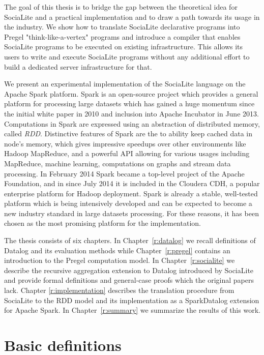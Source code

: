 The goal of this thesis is to bridge the gap between the theoretical idea for SociaLite and a practical implementation and to draw a path towards its usage in the industry. We show how to translate SociaLite declarative programs into Pregel "think-like-a-vertex" programs and introduce a compiler that enables SociaLite programs to be executed on existing infrastructure. This allows its users to write and execute SociaLite programs without any additional effort to build a dedicated server infrastructure for that.

We present an experimental implementation of the SociaLite language on the Apache Spark platform. Spark \cite{spark2} is an open-source project which provides a general platform for processing large datasets which has gained a huge momentum since the initial white paper in 2010 \cite{spark} and inclusion into Apache Incubator in June 2013. Computations in Spark are expressed using an abstraction of distributed memory, called \emph{RDD}. Distinctive features of Spark are the to ability keep cached data in node's memory, which gives impressive speedups over other environments like Hadoop MapReduce, and a powerful API allowing for various usages including MapReduce, machine learning, computations on graphs and stream data processing. In February 2014 Spark became a top-level project of the Apache Foundation, and in since July 2014 it is included in the Cloudera CDH, a popular enterprise platform for Hadoop deployment. Spark is already a stable, well-tested platform which is being intensively developed and can be expected to become a new industry standard in large datasets processing. For these reasons, it has been chosen as the most promising platform for the implementation.

The thesis consists of six chapters. In Chapter~\ref{r:datalog} we recall definitions of Datalog and its evaluation methods while Chapter~\ref{r:pregel} contains an introduction to the Pregel computation model. In Chapter~\ref{r:socialite} we describe the recursive aggregation extension to Datalog introduced by SociaLite and provide formal definitions and general-case proofs which the original papers lack. Chapter \ref{r:implementation} describes the translation procedure from SociaLite to the RDD model and its implementation as a SparkDatalog extension for Apache Spark. In Chapter~\ref{r:summary} we summarize the results of this work.

\section{Basic definitions}\label{r:basicdefs}

